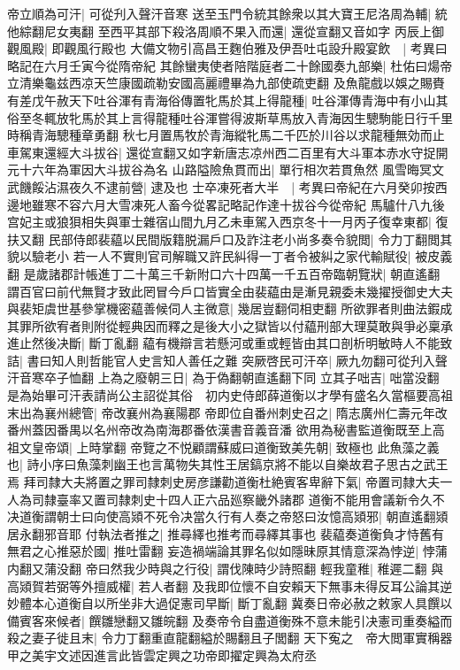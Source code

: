 帝立順為可汗|{
	可從刋入聲汗音寒}
送至玉門令統其餘衆以其大寶王尼洛周為輔|{
	統他綜翻尼女夷翻}
至西平其部下殺洛周順不果入而還|{
	還從宣翻又音如字}
丙辰上御觀風殿|{
	即觀風行殿也}
大備文物引高昌王麴伯雅及伊吾吐屯設升殿宴飲　|{
	考異曰略記在六月壬寅今從隋帝紀}
其餘蠻夷使者陪階庭者二十餘國奏九部樂|{
	杜佑曰煬帝立清樂龜兹西凉天竺康國疏勒安國高麗禮畢為九部使疏吏翻}
及魚龍戲以娛之賜賚有差戊午赦天下吐谷渾有青海俗傳置牝馬於其上得龍種|{
	吐谷渾傳青海中有小山其俗至冬輒放牝馬於其上言得龍種吐谷渾嘗得波斯草馬放入青海因生驄駒能日行千里時稱青海驄種章勇翻}
秋七月置馬牧於青海縱牝馬二千匹於川谷以求龍種無効而止車駕東還經大斗拔谷|{
	還從宣翻又如字新唐志凉州西二百里有大斗軍本赤水守捉開元十六年為軍因大斗拔谷為名}
山路隘險魚貫而出|{
	單行相次若貫魚然}
風雪晦冥文武饑餒沾濕夜久不逮前營|{
	逮及也}
士卒凍死者大半　|{
	考異曰帝紀在六月癸卯按西邊地雖寒不容六月大雪凍死人畜今從畧記略記作達十拔谷今從帝紀}
馬驢什八九後宫妃主或狼狽相失與軍士雜宿山間九月乙未車駕入西京冬十一月丙子復幸東都|{
	復扶又翻}
民部侍郎裴藴以民間版籍脱漏戶口及詐注老小尚多奏令貌閲|{
	令力丁翻閲其貌以驗老小}
若一人不實則官司解職又許民糾得一丁者令被糾之家代輸賦役|{
	被皮義翻}
是歲諸郡計帳進丁二十萬三千新附口六十四萬一千五百帝臨朝覽狀|{
	朝直遙翻}
謂百官曰前代無賢才致此罔冒今戶口皆實全由裴藴由是漸見親委未幾擢授御史大夫與裴矩虞世基參掌機密藴善候伺人主微意|{
	幾居豈翻伺相吏翻}
所欲罪者則曲法鍜成其罪所欲宥者則附從輕典因而釋之是後大小之獄皆以付藴刑部大理莫敢與爭必稟承進止然後决斷|{
	斷丁亂翻}
藴有機辯言若懸河或重或輕皆由其口剖析明敏時人不能致詰|{
	書曰知人則哲能官人史言知人善任之難}
突厥啓民可汗卒|{
	厥九勿翻可從刋入聲汗音寒卒子恤翻}
上為之廢朝三日|{
	為于偽翻朝直遙翻下同}
立其子咄吉|{
	咄當没翻}
是為始畢可汗表請尚公主詔從其俗　初内史侍郎薛道衡以才學有盛名久當樞要高祖末出為襄州總管|{
	帝改襄州為襄陽郡}
帝即位自番州刺史召之|{
	隋志廣州仁壽元年改番州蓋因番禺以名州帝改為南海郡番依漢書音義音潘}
欲用為秘書監道衡既至上高祖文皇帝頌|{
	上時掌翻}
帝覽之不悦顧謂蘇威曰道衡致美先朝|{
	致極也}
此魚藻之義也|{
	詩小序曰魚藻刺幽王也言萬物失其性王居鎬京將不能以自樂故君子思古之武王焉}
拜司隸大夫將置之罪司隸刺史房彦謙勸道衡杜絶賓客卑辭下氣|{
	帝置司隸大夫一人為司隸臺率又置司隸刺史十四人正六品廵察畿外諸郡}
道衡不能用會議新令久不决道衡謂朝士曰向使高熲不死令决當久行有人奏之帝怒曰汝憶高熲邪|{
	朝直遙翻熲居永翻邪音耶}
付執法者推之|{
	推尋繹也推考而尋繹其事也}
裴藴奏道衡負才恃舊有無君之心推惡於國|{
	推吐雷翻}
妄造禍端論其罪名似如隱昧原其情意深為悖逆|{
	悖蒲内翻又蒲没翻}
帝曰然我少時與之行役|{
	謂伐陳時少詩照翻}
輕我童稚|{
	稚遲二翻}
與高熲賀若弼等外擅威權|{
	若人者翻}
及我即位懷不自安賴天下無事未得反耳公論其逆妙體本心道衡自以所坐非大過促憲司早斷|{
	斷丁亂翻}
冀奏日帝必赦之敕家人具饌以備賓客來候者|{
	饌雛戀翻又雛皖翻}
及奏帝令自盡道衡殊不意未能引决憲司重奏縊而殺之妻子徙且末|{
	令力丁翻重直龍翻縊於賜翻且子閭翻}
天下寃之　帝大閲軍實稱器甲之美宇文述因進言此皆雲定興之功帝即擢定興為太府丞

